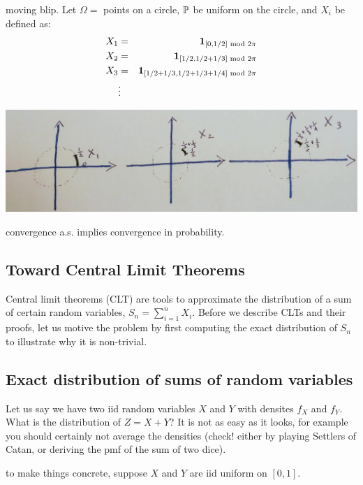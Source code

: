 \documentclass{article}
\begin{document}
 moving blip. Let $\Omega = $ points on a circle, $\P$ be uniform on the circle, and $X_i$ be defined as:
\begin{eqnarray*}
X_1 &=& \1_{[0,1/2]\text{ mod }2\pi}\\
X_2 &=& \1_{[1/2,1/2+1/3]\text{ mod }2\pi}\\
X_3 &=& \1_{[1/2+1/3,1/2+1/3+1/4]\text{ mod }2\pi}\\
&\vdots&
\end{eqnarray*}
\begin{center}
	\includegraphics[width=0.8\linewidth]{figures/moving-blip} 
\end{center}

 convergence a.s. implies convergence in probability.

 


\subsection{Toward Central Limit Theorems} 

Central limit theorems (CLT) are tools to approximate the distribution of a sum of certain random variables, $S_n = \sum_{i=1}^n X_i$. Before we describe CLTs and their proofs, let us motive the problem by first computing the exact distribution of $S_n$ to illustrate why it is non-trivial.


\subsection{Exact distribution of sums of random variables}

Let us say we have two iid random variables $X$ and $Y$ with densites $f_X$ and $f_Y$. What is the distribution of $Z = X + Y$? It is not as easy as it looks, for example you should certainly not average the densities (check! either by playing Settlers of Catan, or deriving the pmf of the sum of two dice).

 to make things concrete, suppose $X$ and $Y$ are iid uniform on $[0, 1]$.
\end{document}
